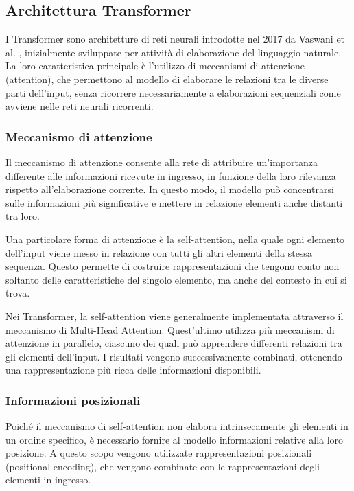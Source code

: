\subsection{Architettura Transformer}

I Transformer sono architetture di reti neurali introdotte nel 2017 da Vaswani et al. \cite{transformer}, inizialmente sviluppate per attività di elaborazione del linguaggio naturale. La loro caratteristica principale è l'utilizzo di meccanismi di attenzione (attention), che permettono al modello di elaborare le relazioni tra le diverse parti dell'input, senza ricorrere necessariamente a elaborazioni sequenziali come avviene nelle reti neurali ricorrenti.

\subsubsection{Meccanismo di attenzione}

Il meccanismo di attenzione consente alla rete di attribuire un'importanza differente alle informazioni ricevute in ingresso, in funzione della loro rilevanza rispetto all'elaborazione corrente. In questo modo, il modello può concentrarsi sulle informazioni più significative e mettere in relazione elementi anche distanti tra loro.

Una particolare forma di attenzione è la self-attention, nella quale ogni elemento dell'input viene messo in relazione con tutti gli altri elementi della stessa sequenza. Questo permette di costruire rappresentazioni che tengono conto non soltanto delle caratteristiche del singolo elemento, ma anche del contesto in cui si trova.

Nei Transformer, la self-attention viene generalmente implementata attraverso il meccanismo di Multi-Head Attention. Quest'ultimo utilizza più meccanismi di attenzione in parallelo, ciascuno dei quali può apprendere differenti relazioni tra gli elementi dell'input. I risultati vengono successivamente combinati, ottenendo una rappresentazione più ricca delle informazioni disponibili.

\subsubsection{Informazioni posizionali}

Poiché il meccanismo di self-attention non elabora intrinsecamente gli elementi in un ordine specifico, è necessario fornire al modello informazioni relative alla loro posizione. A questo scopo vengono utilizzate rappresentazioni posizionali (positional encoding), che vengono combinate con le rappresentazioni degli elementi in ingresso.


